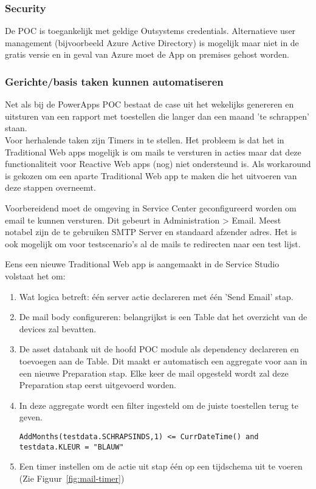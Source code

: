 \subsubsection{Security}

De POC is toegankelijk met geldige Outsystems credentials. Alternatieve user management (bijvoorbeeld Azure Active Directory) is mogelijk maar niet in de gratis versie en in geval van Azure moet de App on premises gehost worden.

\subsubsection{Gerichte/basis taken kunnen automatiseren}
\label{subsec:os-automatisatie}

Net als bij de PowerApps POC bestaat de case uit het wekelijks genereren en uitsturen van een rapport met toestellen die langer dan een maand 'te schrappen' staan.\\
Voor herhalende taken zijn Timers in te stellen. Het probleem is dat het in Traditional Web apps mogelijk is om mails te versturen in acties maar dat deze functionaliteit voor Reactive Web apps (nog) niet ondersteund is. Als workaround is gekozen om een aparte Traditional Web app te maken die het uitvoeren van deze stappen overneemt.

Voorbereidend moet de omgeving in Service Center geconfigureerd worden om email te kunnen versturen. Dit gebeurt in Administration > Email. Meest notabel zijn de te gebruiken SMTP Server en standaard afzender adres. Het is ook mogelijk om voor testscenario's al de mails te redirecten naar een test lijst.

Eens een nieuwe Traditional Web app is aangemaakt in de Service Studio volstaat het om:
\begin{enumerate}
    \item Wat logica betreft: één server actie declareren met één 'Send Email' stap.
    \item De mail body configureren: belangrijkst is een Table dat het overzicht van de devices zal bevatten.
    \item De asset databank uit de hoofd POC module als dependency declareren en toevoegen aan de Table. Dit maakt er automatisch een aggregate voor aan in een nieuwe Preparation stap. Elke keer de mail opgesteld wordt zal deze Preparation stap eerst uitgevoerd worden.
    \item In deze aggregate wordt een filter ingesteld om de juiste toestellen terug te geven.
\begin{lstlisting}
AddMonths(testdata.SCHRAPSINDS,1) <= CurrDateTime() and testdata.KLEUR = "BLAUW"
\end{lstlisting} 
    \item Een timer instellen om de actie uit stap één op een tijdschema uit te voeren (Zie Figuur~\ref{fig:mail-timer})
\end{enumerate}

